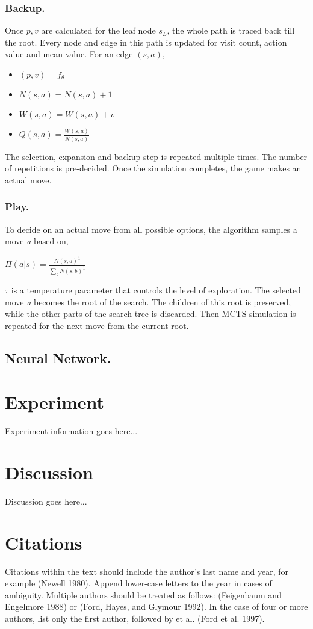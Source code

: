 \documentclass[letterpaper]{article}
\begin{document}
\subsubsection{Backup.} Once $p,v$ are calculated for the leaf node $s_L$, the whole path is traced back till the root. Every node and edge in this path is updated for visit count, action value and mean value. For an edge $(s,a)$,
\begin{itemize}
    \item $(p,v) = f_{\theta}$
    \item $N(s,a) = N(s,a) + 1$
    \item $W(s,a) = W(s,a) + v$
    \item $Q(s,a) = \frac{W(s,a)}{N(s,a)}$
\end{itemize}
The selection, expansion and backup step is repeated multiple times. The number of repetitions is pre-decided. Once the simulation completes, the game makes an actual move.
\subsubsection{Play.} To decide on an actual move from all possible options, the algorithm samples a move \textit{a} based on,
\begin{center}
    $\Pi(a|s) = \frac{N(s,a)^{\frac{1}{\tau}}}{\sum_{b} N(s,b)^{\frac{1}{\tau}}}$
\end{center}
$\tau$ is a temperature parameter that controls the level of exploration. The selected move \textit{a} becomes the root of the search. The children of this root is preserved, while the other parts of the search tree is discarded. Then MCTS simulation is repeated for the next move from the current root. 

\subsection{Neural Network.}

\section{Experiment} Experiment information goes here...


\section{Discussion} Discussion goes here...


\section{Citations}
Citations within the text should include the author's last name and year, for example (Newell 1980). Append lower-case letters to the year in cases of ambiguity. Multiple authors should be treated as follows: (Feigenbaum and Engelmore 1988) or (Ford, Hayes, and Glymour 1992). In the case of four or more authors, list only the first author, followed by et al. (Ford et al. 1997).
\end{document}
